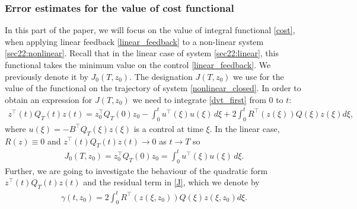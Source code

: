 \documentclass[../main.tex]{subfiles}
\begin{document}
\subsubsection{Error estimates for the value of cost functional}

In this part  of the paper, we will focus on the value of integral functional \eqref{cost}, when applying linear feedback \eqref{linear_feedback} to a non-linear system \eqref{sec22:nonlinear}. Recall that in the linear case of system \eqref{sec22:linear}, this functional takes the minimum value on the control \eqref{linear_feedback}. We previously denote it by $J_0(T,z_0)$. The designation $J(T,z_0)$ we use for the value of the functional on the trajectory  of system \eqref{nonlinear_closed}.
 In order to obtain an  expression for $J(T,z_0)$ we need to integrate \eqref{dvt_first} from $0$ to $t$:
\begin{gather}\label{J}
	z^{\top}(t) Q_T(t)z(t) = z_0^{\top} Q_T(0)z_0 - \int_{0}^{t} u^{\top}(\xi)  u(\xi) \, d\xi + 2\int_{0}^{t}  R^{\top}(z(\xi))Q(\xi) z(\xi) d\xi,
\end{gather}
    where $ u(\xi) = -B^{\top} Q_T(\xi) z(\xi)$ is a control at time $\xi$. In the linear case, $R(z) \equiv 0$ and $z^{\top}(t) Q_T(t)z(t) \to 0 $ as $t \to T$ so
\begin{gather*}
    J_0(T,z_0) = z_0^{\top} Q_T(0)z_0 = \int_{0}^{t} u^{\top}(\xi)  u(\xi) \, d\xi.
\end{gather*}
Further, we are going to investigate the behaviour of the quadratic form $z^{\top}(t) Q_T(t)z(t) $ and the residual term in \eqref{J}, which we denote by
\begin{gather*}
			\gamma (t,z_0) = 
		 2\int_{0}^{t}  R^{\top}(z(\xi,z_0))Q(\xi) z(\xi,z_0) d\xi.
\end{gather*}
\end{document}
